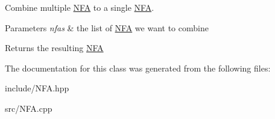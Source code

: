 Combine multiple \hyperlink{classNFA}{N\+FA} to a single \hyperlink{classNFA}{N\+FA}. 


\begin{DoxyParams}{Parameters}
{\em nfas} & the list of \hyperlink{classNFA}{N\+FA} we want to combine \\
\hline
\end{DoxyParams}
\begin{DoxyReturn}{Returns}
the resulting \hyperlink{classNFA}{N\+FA} 
\end{DoxyReturn}


The documentation for this class was generated from the following files\+:\begin{DoxyCompactItemize}
\item 
include/N\+F\+A.\+hpp\item 
src/N\+F\+A.\+cpp\end{DoxyCompactItemize}
